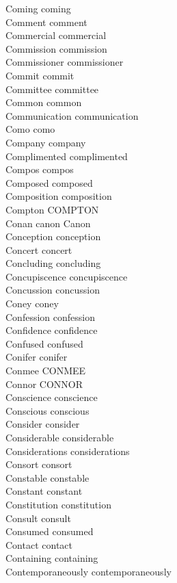 Coming coming\\
Comment comment\\
Commercial commercial\\
Commission commission\\
Commissioner commissioner\\
Commit commit\\
Committee committee\\
Common common\\
Communication communication\\
Como como\\
Company company\\
Complimented complimented\\
Compos compos\\
Composed composed\\
Composition composition\\
Compton COMPTON\\
Conan canon Canon\\
Conception conception\\
Concert concert\\
Concluding concluding\\
Concupiscence concupiscence\\
Concussion concussion\\
Coney coney\\
Confession confession\\
Confidence confidence\\
Confused confused\\
Conifer conifer\\
Conmee CONMEE\\
Connor CONNOR\\
Conscience conscience\\
Conscious conscious\\
Consider consider\\
Considerable considerable\\
Considerations considerations\\
Consort consort\\
Constable constable\\
Constant constant\\
Constitution constitution\\
Consult consult\\
Consumed consumed\\
Contact contact\\
Containing containing\\
Contemporaneously contemporaneously\\
